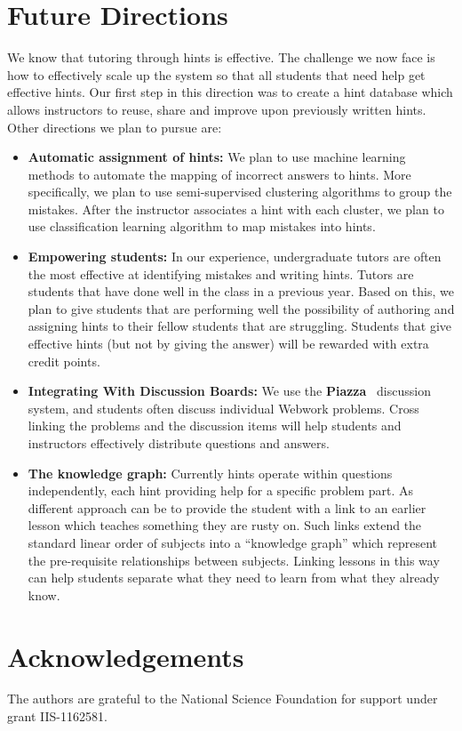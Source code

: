 \documentclass{sigchi}
\begin{document}
\section{Future Directions}
We know that tutoring through hints is effective. The challenge we now
face is how to effectively scale up the system so that all students
that need help get effective hints. Our first step in this direction
was to create a hint database which allows instructors to reuse, share
and improve upon previously written hints. Other directions we plan to
pursue are:
\begin{itemize}
\item {\bf Automatic assignment of hints:} We plan to use machine
  learning methods to automate the mapping of incorrect answers to
  hints. More specifically, we plan to use semi-supervised clustering
  algorithms to group the mistakes. After the instructor associates a
  hint with each cluster, we plan to use classification learning
  algorithm to map mistakes into hints.
\item {\bf Empowering students:} In our experience, undergraduate
  tutors are often the most effective at identifying mistakes and
  writing hints. Tutors are students that have done well in the class
  in a previous year. Based on this, we plan to give students that are
  performing well the possibility of authoring and assigning hints to
  their fellow students that are struggling. Students that give
  effective hints (but not by giving the answer) will be rewarded with
  extra credit points. 
\item {\bf Integrating With Discussion Boards:} We use the {\bf
  Piazza}~\cite{Piazza} discussion system, and students often discuss
  individual Webwork problems. Cross linking the problems and the
  discussion items will help students and instructors effectively
  distribute questions and answers.
\item {\bf The knowledge graph:} Currently hints operate within
  questions independently, each hint providing help for a specific
  problem part. As different approach can be to provide the student
  with a link to an earlier lesson which teaches something they are
  rusty on. Such links extend the standard linear order of subjects
  into a ``knowledge graph'' which represent the pre-requisite
  relationships between subjects. Linking lessons in this way can help
  students separate what they need to learn from what they already
  know.
\end{itemize}
\section{Acknowledgements}
The authors are grateful to the National Science Foundation for support under grant IIS-1162581.


\end{document}
